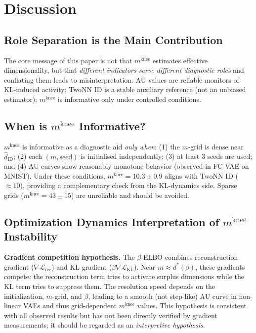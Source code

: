 \documentclass[make,article,submit,pdftex,moreauthors]{Definitions/mdpi}
\newcommand{\mknee}{m^{\mathrm{knee}}}
\newcommand{\hatdID}{\hat{d}_{\mathrm{ID}}}
\begin{document}
\section{Discussion}\label{sec:discussion}

\subsection{Role Separation is the Main Contribution}\label{sec:disc_roles}

The core message of this paper is not that $\mknee$ estimates effective
dimensionality, but that \emph{different indicators serve different diagnostic
roles} and conflating them leads to misinterpretation.
AU values are reliable monitors of KL-induced activity; TwoNN ID is a stable
auxiliary reference (not an unbiased estimator); $\mknee$ is informative only
under controlled conditions.

\subsection{\texorpdfstring{When is $\mknee$ Informative?}{When is m\_knee Informative?}}\label{sec:disc_mknee}

$\mknee$ is informative as a diagnostic aid \emph{only when}:
(1) the $m$-grid is dense near $\hatdID$; (2) each $(m,\text{seed})$ is
initialised independently; (3) at least 3 seeds are used; and
(4) AU curves show reasonably monotone behavior (observed in FC-VAE on MNIST).
Under these conditions, $\mknee=10.3\pm0.9$ aligns with TwoNN ID ($\approx10$),
providing a complementary check from the KL-dynamics side.
Sparse grids ($\mknee=43\pm15$) are unreliable and should be avoided.

\subsection{\texorpdfstring{Optimization Dynamics Interpretation of $\mknee$ Instability}{Optimization Dynamics Interpretation of m\_knee Instability}}
\label{sec:disc_grad}

\textbf{Gradient competition hypothesis.}
The $\beta$-ELBO combines reconstruction gradient ($\nabla\mathcal{L}_{\mathrm{rec}}$)
and KL gradient ($\beta\nabla\mathcal{L}_{\mathrm{KL}}$).
Near $m\approx d^*(\beta)$, these gradients compete: the reconstruction term
tries to activate surplus dimensions while the KL term tries to suppress them.
The resolution speed depends on the initialization, $m$-grid, and $\beta$,
leading to a smooth (not step-like) AU curve in non-linear VAEs and thus
grid-dependent $\mknee$ values.
This hypothesis is consistent with all observed results but has not been
directly verified by gradient measurements; it should be regarded as an
\emph{interpretive hypothesis}.
\end{document}
